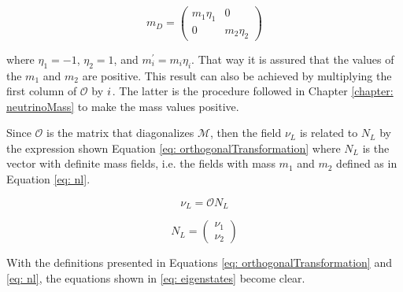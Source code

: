 $$m_{D} = \begin{pmatrix} m_{1}\eta_{1} & 0 \\ 0 & m_{2}\eta_{2} \end{pmatrix}$$

where $\eta_{1} = -1$, $\eta_{2} = 1$, and $m_{i}^{\prime} = m_{i}\eta_{i}$. That way it is assured that the values of the $m_{1}$ and $m_{2}$ are positive. This result can also be achieved by multiplying the first column of $\mathcal{O}$ by ${i\mkern1mu}$. The latter is the procedure followed in Chapter \ref{chapter: neutrinoMass} to make the mass values positive.


Since $\mathcal{O}$ is the matrix that diagonalizes $\mathcal{M}$, then the field $\nu_{L}$ is related to $N_{L}$ by the expression shown Equation \ref{eq: orthogonalTransformation} where $N_{L}$ is the vector with definite mass fields, i.e. the fields with mass $m_{1}$ and $m_{2}$ defined as in Equation \ref{eq: nl}.

\begin{equation}\label{eq: orthogonalTransformation}
 \nu_{L} = \mathcal{O}N_{L}
\end{equation}


\begin{equation}\label{eq: nl}
 N_{L} = \begin{pmatrix} \nu_{1} \\ \nu_{2} \end{pmatrix}
\end{equation}


With the definitions presented in Equations \ref{eq: orthogonalTransformation} and \ref{eq: nl}, the equations shown in \ref{eq: eigenstates} become clear.


 